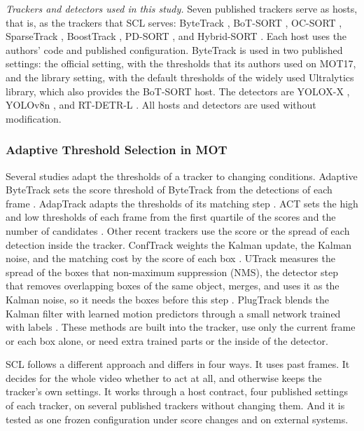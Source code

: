 \documentclass[pdflatex,sn-mathphys-num,iicol]{sn-jnl}
\newcommand{\scl}{SCL}
\begin{document}
\emph{Trackers and detectors used in this study.} Seven published trackers serve as hosts, that
is, as the trackers that \scl{} serves: ByteTrack \cite{zhang2022bytetrack}, BoT-SORT
\cite{aharon2022botsort}, OC-SORT \cite{cao2023ocsort}, SparseTrack \cite{liu2025sparsetrack},
BoostTrack \cite{stanojevic2024boosttrack}, PD-SORT \cite{wang2025pdsort}, and Hybrid-SORT
\cite{yang2024hybridsort}. Each host uses the authors' code and published configuration. ByteTrack
is used in two published settings: the official setting, with the thresholds that its authors used
on MOT17, and the library setting, with the default thresholds of the widely used Ultralytics
library, which also provides the BoT-SORT host. The detectors are YOLOX-X \cite{ge2021yolox},
YOLOv8n \cite{jocher2023yolov8}, and RT-DETR-L \cite{zhao2024rtdetr}. All hosts and detectors are
used without modification.

\subsubsection{Adaptive Threshold Selection in MOT}
Several studies adapt the thresholds of a tracker to changing conditions. Adaptive ByteTrack sets
the score threshold of ByteTrack from the detections of each frame \cite{ma2023adaptivebytetrack}.
AdapTrack adapts the thresholds of its matching step \cite{shim2024adaptrack}. ACT sets the high and
low thresholds of each frame from the first quartile of the scores and the number of candidates
\cite{act2026adaptive}. Other recent trackers use the score or the spread of each detection inside
the tracker. ConfTrack weights the Kalman update, the Kalman noise, and the matching cost by the
score of each box \cite{jung2024conftrack}. UTrack measures the spread of the boxes that
non-maximum suppression (NMS), the detector step that removes overlapping boxes of the same object,
merges, and uses it as the Kalman noise, so it needs the boxes before this step
\cite{solano2025utrack}. PlugTrack blends the Kalman filter with learned motion predictors through a
small network trained with labels \cite{kim2026plugtrack}. These methods are built into the tracker,
use only the current frame or each box alone, or need extra trained parts or the inside of the
detector.

\scl{} follows a different approach and differs in four ways. It uses past frames. It decides for
the whole video whether to act at all, and otherwise keeps the tracker's own settings. It works
through a host contract, four published settings of each tracker, on several published trackers
without changing them. And it is tested as one frozen configuration under score changes and on
external systems.
\end{document}
